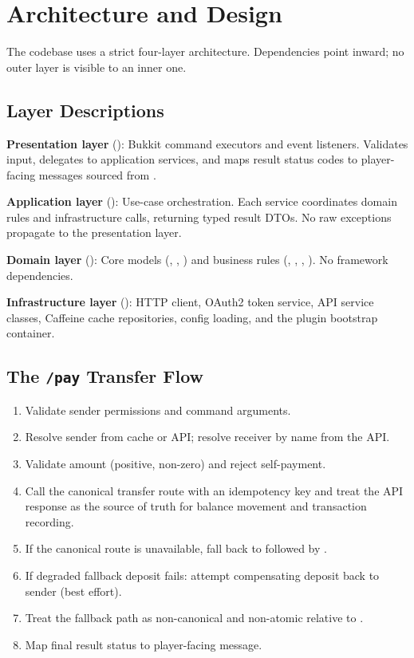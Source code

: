 \section{Architecture and Design}

The codebase uses a strict four-layer architecture. Dependencies point inward; no outer layer is visible to an inner one.

\subsection{Layer Descriptions}

\textbf{Presentation layer} (): Bukkit command executors and event listeners. Validates input, delegates to application services, and maps result status codes to player-facing messages sourced from .

\textbf{Application layer} (): Use-case orchestration. Each service coordinates domain rules and infrastructure calls, returning typed result DTOs. No raw exceptions propagate to the presentation layer.

\textbf{Domain layer} (): Core models (, , ) and business rules (, , , ). No framework dependencies.

\textbf{Infrastructure layer} (): HTTP client, OAuth2 token service, API service classes, Caffeine cache repositories, config loading, and the plugin bootstrap container.

\subsection{The \texttt{/pay} Transfer Flow}

\begin{enumerate}
  \item Validate sender permissions and command arguments.
  \item Resolve sender from cache or API; resolve receiver by name from the API.
  \item Validate amount (positive, non-zero) and reject self-payment.
  \item Call the canonical transfer route  with an idempotency key and treat the API response as the source of truth for balance movement and transaction recording.
  \item If the canonical route is unavailable, fall back to  followed by .
  \item If degraded fallback deposit fails: attempt compensating deposit back to sender (best effort).
  \item Treat the fallback path as non-canonical and non-atomic relative to .
  \item Map final result status to player-facing message.
\end{enumerate}


